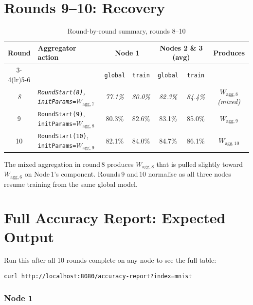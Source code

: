 \documentclass[11pt,a4paper]{article}
\newcommand{\Wagg}[1]{$W_{\text{agg},#1}$}
\newcommand{\stalecell}[1]{\cellcolor{orange!20}\textit{#1}}
\begin{document}
\section{Rounds 9--10: Recovery}
\label{sec:recovery}

\begin{table}[H]
\centering
\small
\caption{Round-by-round summary, rounds 8--10}
\setlength{\tabcolsep}{5pt}
\begin{tabularx}{\textwidth}{c X c c c c c}
\toprule
\textbf{Round} & \textbf{Aggregator action} &
  \multicolumn{2}{c}{\textbf{Node 1}} &
  \multicolumn{2}{c}{\textbf{Nodes 2 \& 3 (avg)}} &
  \textbf{Produces} \\
\cmidrule(lr){3-4}\cmidrule(lr){5-6}
& & \texttt{global} & \texttt{train} & \texttt{global} & \texttt{train} & \\
\midrule
\stalecell{8} &
  \stalecell{\texttt{RoundStart(8)}, \texttt{initParams=}\Wagg{7}} &
  \stalecell{77.1\%} & \stalecell{80.0\%} &
  \stalecell{82.3\%} & \stalecell{84.4\%} &
  \stalecell{\Wagg{8} (mixed)} \\
9 & \texttt{RoundStart(9)}, \texttt{initParams=}\Wagg{8} &
  80.3\% & 82.6\% & 83.1\% & 85.0\% & \Wagg{9} \\
10 & \texttt{RoundStart(10)}, \texttt{initParams=}\Wagg{9} &
  82.1\% & 84.0\% & 84.7\% & 86.1\% & \Wagg{10} \\
\bottomrule
\end{tabularx}
\end{table}

\noindent The mixed aggregation in round\,8 produces \Wagg{8} that is
pulled slightly toward \Wagg{6} on Node\,1's component.
Rounds\,9 and\,10 normalise as all three nodes resume training from
the same global model.

\newpage
\section{Full Accuracy Report: Expected Output}
\label{sec:report}

Run this after all 10 rounds complete on any node to see the full table:

\begin{lstlisting}[style=bash]
curl http://localhost:8080/accuracy-report?index=mnist
\end{lstlisting}

\subsubsection*{Node 1}
\end{document}
